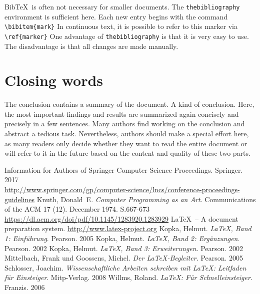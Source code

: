 \documentclass{llncs}
\begin{document}
Bib\TeX\ is often not necessary for smaller documents. The \texttt{thebibliography} environment is sufficient here. Each new entry begins with the command \verb!\bibitem{mark}! In continuous text, it is possible to refer to this marker via \verb!\ref{marker}! One advantage of \texttt{thebibliography} is that it is very easy to use. The disadvantage is that all changes are made manually.

\section{Closing words}

The conclusion contains a summary of the document. A kind of conclusion. Here, the most important findings and results are summarized again concisely and precisely in a few sentences. Many authors find working on the conclusion and abstract a tedious task. Nevertheless, authors should make a special effort here, as many readers only decide whether they want to read the entire document or will refer to it in the future based on the content and quality of these two parts.



\begin{thebibliography}{5}

Information for Authors of Springer Computer Science Proceedings. Springer. 2017\\
\url{http://www.springer.com/gp/computer-science/lncs/conference-proceedings-guidelines}
Knuth, Donald~E. \textsl{Computer Programming as an Art}. Communications of the ACM 17 (12). December 1974. S.667-673\\
\url{https://dl.acm.org/doi/pdf/10.1145/1283920.1283929}
\LaTeX\ -- A document preparation system.
\url{http://www.latex-project.org}
Kopka, Helmut. \textsl{\LaTeX, Band 1: Einführung}. Pearson. 2005
Kopka, Helmut. \textsl{\LaTeX, Band 2: Ergänzungen}. Pearson. 2002
Kopka, Helmut. \textsl{\LaTeX, Band 3: Erweiterungen}. Pearson. 2002
Mittelbach, Frank und Goossens, Michel. \textsl{Der LaTeX-Begleiter}. Pearson. 2005
Schlosser, Joachim. \textsl{Wissenschaftliche Arbeiten schreiben mit LaTeX: Leitfaden für Einsteiger}. Mitp-Verlag. 2008
Willms, Roland. \textsl{\LaTeX: Für Schnelleinsteiger}. Franzis. 2006
\end{thebibliography}
\end{document}
